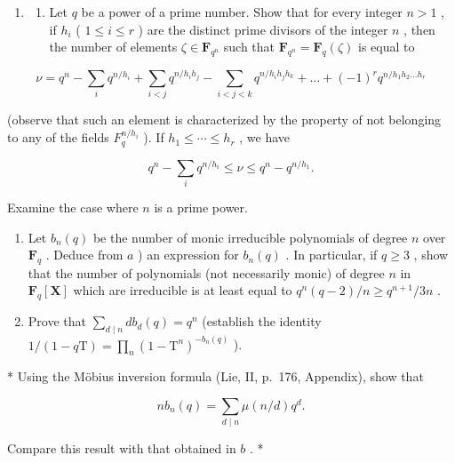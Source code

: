 \BourbakiExerciseGroup

\begin{enumerate}
\def\labelenumi{\arabic{enumi})}
\tightlist
\item
  \begin{enumerate}
  \def\labelenumii{\alph{enumii})}
  \tightlist
  \item
    Let \(q\) be a power of a prime number. Show that for every integer \(n > 1\) , if \(h_i\) ( \(1 \leqslant i \leqslant r\) ) are the distinct prime divisors of the integer \(n\) , then the number of elements \(\zeta \in \mathbf{F}_{q^n}\) such that \(\mathbf{F}_{q^n} = \mathbf{F}_q(\zeta)\) is equal to
  \end{enumerate}
\end{enumerate}

\[
\nu = q ^ {n} - \sum_ {i} q ^ {n / h _ {i}} + \sum_ {i <   j} q ^ {n / h _ {i} h _ {j}} - \sum_ {i <   j <   k} q ^ {n / h _ {i} h _ {j} h _ {k}} + \dots + (- 1) ^ {r} q ^ {n / h _ {1} h _ {2} \dots h _ {r}}
\]

(observe that such an element is characterized by the property of not belonging to any of the fields \(F_{q}^{n/h_{i}}\) ). If \(h_{1} \leqslant \cdots \leqslant h_{r}\) , we have

\[
q ^ {n} - \sum_ {i} q ^ {n / h _ {i}} \leqslant \nu \leqslant q ^ {n} - q ^ {n / h _ {1}}.
\]

Examine the case where \(n\) is a prime power.

\begin{enumerate}
\def\labelenumi{\alph{enumi})}
\setcounter{enumi}{1}
\item
  Let \(b_{n}(q)\) be the number of monic irreducible polynomials of degree \(n\) over \(\mathbf{F}_q\) . Deduce from \(a\) ) an expression for \(b_{n}(q)\) . In particular, if \(q \geqslant 3\) , show that the number of polynomials (not necessarily monic) of degree \(n\) in \(\mathbf{F}_q[\mathbf{X}]\) which are irreducible is at least equal to \(q^n (q - 2) / n \geqslant q^{n + 1} / 3n\) .
\item
  Prove that \(\sum_{d\mid n}db_d(q) = q^n\) (establish the identity \(1 / (1 - q\mathrm{T}) = \prod_{n}(1 - \mathrm{T}^n)^{-b_n(q)}\) ).
\end{enumerate}

* Using the Möbius inversion formula (Lie, II, p.~176, Appendix), show that

\[
n b _ {n} (q) = \sum_ {d \mid n} \mu (n / d) q ^ {d}.
\]

Compare this result with that obtained in \(b\) . *

